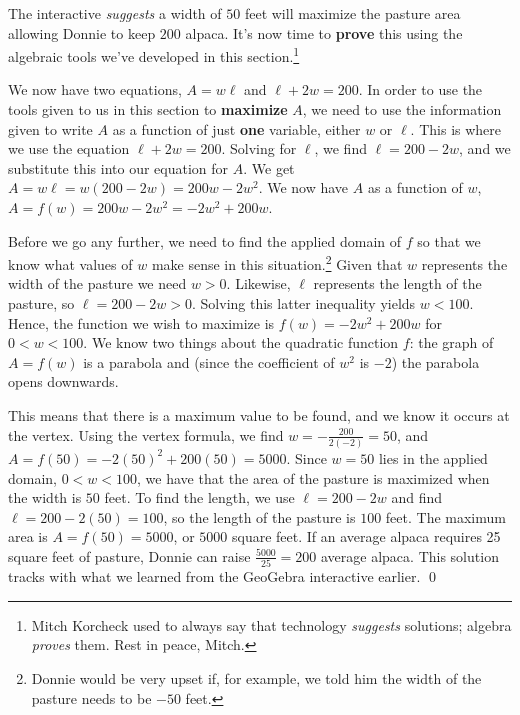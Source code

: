 \documentclass{ximera}
\begin{document}
\begin{example}
\begin{explanation}
\begin{center}
\end{center}

  The interactive \textit{suggests} a width of $50$ feet will maximize the pasture area allowing Donnie to keep $200$ alpaca.  It's now time to \textbf{prove} this using the algebraic tools we've developed in this section.\footnote{Mitch Korcheck used to always say that technology \textit{suggests} solutions;  algebra \textit{proves} them.  Rest in peace, Mitch.}
  
  \medskip
  
  We now have two equations, $A = w \ell$ and $\ell+2w = 200$.  In order to use the tools given to us in this section to \textbf{maximize} $A$, we need to use the information given to write $A$ as a function of just \textbf{one} variable, either $w$ or $\ell$. This is where we use the equation $\ell+2w = 200$.  Solving for $\ell$, we find $\ell = 200-2w$, and we substitute this into our equation for $A$.  We get $A = w \ell = w(200-2w) = 200w-2w^2$.  We now have $A$ as a function of $w$, $A = f(w) = 200w-2w^2 = -2w^2+200w$.  



Before we go any further, we need to find the applied domain of $f$ so that we know what values of $w$ make sense in this situation.\footnote{Donnie would be very upset if, for example, we told him the width of the pasture needs to be $-50$ feet.}  Given that $w$ represents the width of the pasture we need $w > 0$.  Likewise, $\ell$ represents the length of the pasture, so $\ell = 200-2w > 0$.  Solving this latter inequality yields $w < 100$.  Hence, the function we wish to maximize is $f(w) = -2w^2 + 200w$ for $0 < w < 100$.  We know two things about the quadratic function $f$: the graph of $A = f(w)$ is a parabola and (since the coefficient of $w^2$ is $-2$) the parabola opens downwards.  

\medskip

This means that there is a maximum value to be found, and we know it occurs at the vertex.  Using the vertex formula, we find $w = -\frac{200}{2(-2)} = 50$, and $A = f(50) = -2(50)^2 + 200(50) = 5000$.  Since $w=50$ lies in the applied domain, $0 < w < 100$, we have that the area of the pasture is maximized when the width is $50$ feet.  To find the length, we use $\ell = 200-2w$ and find $ \ell = 200-2(50) = 100$, so the length of the pasture is $100$ feet.  The maximum area is $A =f(50) = 5000$, or $5000$ square feet.  If an average alpaca requires 25 square feet of pasture, Donnie can raise $\frac{5000}{25} = 200$ average alpaca.  This solution tracks with what we learned from the GeoGebra interactive earlier. \qed
\end{explanation}
\end{example}
\end{document}
